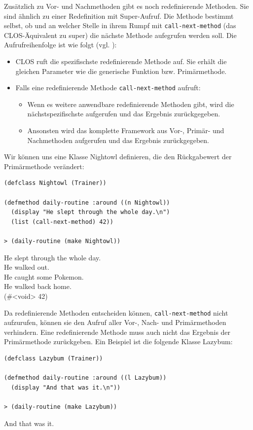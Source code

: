 Zusätzlich zu Vor- und Nachmethoden gibt es noch redefinierende Methoden. Sie sind ähnlich zu einer Redefinition mit Super-Aufruf. Die Methode bestimmt selbst, ob und an welcher Stelle in ihrem Rumpf mit \texttt{call-next-method} (das CLOS-Äquivalent zu super) die nächste Methode aufegrufen werden soll. Die Aufrufreihenfolge ist wie folgt (vgl. \cite[S.103]{keene}):
\begin{itemize}
 \item CLOS ruft die spezifischste redefinierende Methode auf. Sie erhält die gleichen Parameter wie die generische Funktion bzw. Primärmethode.
 \item Falls eine redefinierende Methode \texttt{call-next-method} aufruft:
 \begin{itemize}
  \item Wenn es weitere anwendbare redefinierende Methoden gibt, wird die nächstspezifischste aufgerufen und das Ergebnis zurückgegeben.
  \item Ansonsten wird das komplette Framework aus Vor-, Primär- und Nachmethoden aufgerufen und das Ergebnis zurückgegeben.
 \end{itemize}
\end{itemize}

Wir können uns eine Klasse Nightowl definieren, die den Rückgabewert der Primärmethode verändert:

\begin{lstlisting}
(defclass Nightowl (Trainer))

(defmethod daily-routine :around ((n Nightowl))
  (display "He slept through the whole day.\n")
  (list (call-next-method) 42))
  
> (daily-routine (make Nightowl))
\end{lstlisting}
{\routput He slept through the whole day.\\
\phantom{.}He walked out.\\
\phantom{.}He caught some Pokemon.\\
\phantom{.}He walked back home.\\
\phantom{.}(\#<void> 42)}

Da redefinierende Methoden entscheiden können, \texttt{call-next-method} nicht aufzurufen, können sie den Aufruf aller Vor-, Nach- und Primärmethoden verhindern. Eine redefinierende Methode muss auch nicht das Ergebnis der Primärmethode zurückgeben. Ein Beispiel ist die folgende Klasse Lazybum:

\begin{lstlisting}
(defclass Lazybum (Trainer))

(defmethod daily-routine :around ((l Lazybum))
  (display "And that was it.\n"))
  
> (daily-routine (make Lazybum))
\end{lstlisting}
{\routput And that was it.}

